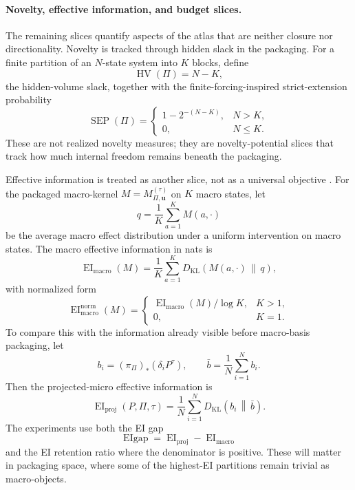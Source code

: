 \documentclass[11pt]{article}
\theoremstyle{definition}
\begin{document}
\paragraph{Novelty, effective information, and budget slices.}
The remaining slices quantify aspects of the atlas that are neither closure nor directionality. Novelty is tracked through hidden slack in the packaging. For a finite partition of an $N$-state system into $K$ blocks, define
\begin{equation}\label{eq:hidden_volume_slack}
\operatorname{HV}(\Pi)=N-K,
\end{equation}
the hidden-volume slack, together with the finite-forcing-inspired strict-extension probability
\begin{equation}\label{eq:strict_extension_probability}
\operatorname{SEP}(\Pi)
=
\begin{cases}
1-2^{-(N-K)}, & N>K,\\
0, & N\le K.
\end{cases}
\end{equation}
These are not realized novelty measures; they are novelty-potential slices that track how much internal freedom remains beneath the packaging.

Effective information is treated as another slice, not as a universal objective \cite{tononi2003measuring,hoel2013causal,hoel2017map,rosas2020reconciling}. For the packaged macro-kernel $M=M_{\Pi,\mathbf{u}}^{(\tau)}$ on $K$ macro states, let
\[
q=\frac{1}{K}\sum_{a=1}^{K} M(a,\cdot)
\]
be the average macro effect distribution under a uniform intervention on macro states. The macro effective information in nats is
\begin{equation}\label{eq:macro_ei}
\operatorname{EI}_{\mathrm{macro}}(M)
=
\frac{1}{K}
\sum_{a=1}^{K}
D_{\mathrm{KL}}\!\left(
M(a,\cdot)\,\middle\|\,q
\right),
\end{equation}
with normalized form
\begin{equation}\label{eq:macro_ei_normalized}
\operatorname{EI}_{\mathrm{macro}}^{\mathrm{norm}}(M)
=
\begin{cases}
\operatorname{EI}_{\mathrm{macro}}(M)/\log K, & K>1,\\
0, & K=1.
\end{cases}
\end{equation}
To compare this with the information already visible before macro-basis packaging, let
\[
b_{i}=(\pi_{\Pi})_{*}(\delta_{i}P^{\tau}),
\qquad
\bar b = \frac{1}{N}\sum_{i=1}^{N} b_{i}.
\]
Then the projected-micro effective information is
\begin{equation}\label{eq:projected_micro_ei}
\operatorname{EI}_{\mathrm{proj}}(P,\Pi,\tau)
=
\frac{1}{N}
\sum_{i=1}^{N}
D_{\mathrm{KL}}\!\left(
b_{i}\,\middle\|\,\bar b
\right).
\end{equation}
The experiments use both the EI gap
\[
\operatorname{EIgap}
=
\operatorname{EI}_{\mathrm{proj}}-\operatorname{EI}_{\mathrm{macro}}
\]
and the EI retention ratio where the denominator is positive. These will matter in packaging space, where some of the highest-EI partitions remain trivial as macro-objects.
\end{document}
